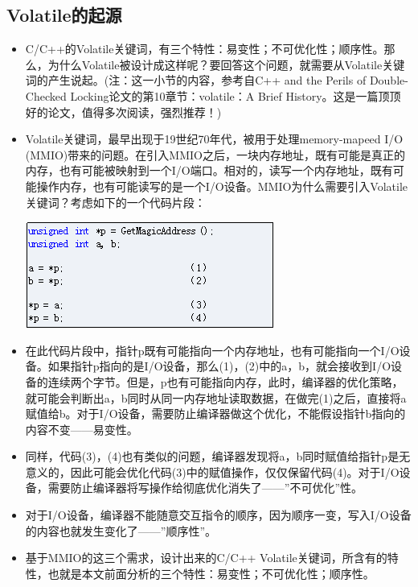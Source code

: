 \documentclass[9pt,b5paper]{article}
\begin{document}
\subsection{Volatile的起源}
\label{sec-9-5}
\begin{itemize}
\item C/C++的Volatile关键词，有三个特性：易变性；不可优化性；顺序性。那么，为什么Volatile被设计成这样呢？要回答这个问题，就需要从Volatile关键词的产生说起。(注：这一小节的内容，参考自C++ and the Perils of Double-Checked Locking论文的第10章节：volatile：A Brief History。这是一篇顶顶好的论文，值得多次阅读，强烈推荐！)
\item Volatile关键词，最早出现于19世纪70年代，被用于处理memory-mapeed I/O (MMIO)带来的问题。在引入MMIO之后，一块内存地址，既有可能是真正的内存，也有可能被映射到一个I/O端口。相对的，读写一个内存地址，既有可能操作内存，也有可能读写的是一个I/O设备。MMIO为什么需要引入Volatile关键词？考虑如下的一个代码片段：

\includegraphics[width=.9\linewidth]{../pic/v13.png}

\item 在此代码片段中，指针p既有可能指向一个内存地址，也有可能指向一个I/O设备。如果指针p指向的是I/O设备，那么(1)，(2)中的a，b，就会接收到I/O设备的连续两个字节。但是，p也有可能指向内存，此时，编译器的优化策略，就可能会判断出a，b同时从同一内存地址读取数据，在做完(1)之后，直接将a赋值给b。对于I/O设备，需要防止编译器做这个优化，不能假设指针b指向的内容不变——易变性。
\item 同样，代码(3)，(4)也有类似的问题，编译器发现将a，b同时赋值给指针p是无意义的，因此可能会优化代码(3)中的赋值操作，仅仅保留代码(4)。对于I/O设备，需要防止编译器将写操作给彻底优化消失了——”不可优化”性。
\item 对于I/O设备，编译器不能随意交互指令的顺序，因为顺序一变，写入I/O设备的内容也就发生变化了——”顺序性”。
\item 基于MMIO的这三个需求，设计出来的C/C++ Volatile关键词，所含有的特性，也就是本文前面分析的三个特性：易变性；不可优化性；顺序性。
\end{itemize}
\end{document}
